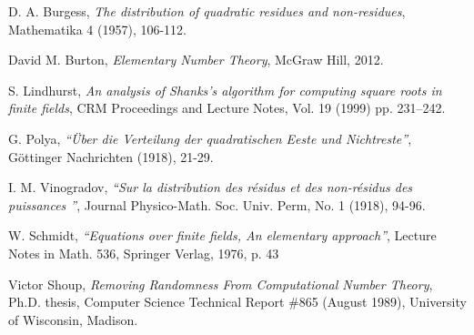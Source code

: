 \documentclass{report}
\begin{document}
%
%
%
%
%
%
%
\begin{thebibliography}{9}

 D. A. Burgess,
\textit{The distribution of quadratic residues and non-residues},
Mathematika 4 (1957), 106-112.

David M. Burton, \textit{Elementary Number Theory},
McGraw Hill, 2012.

S. Lindhurst, \textit{An analysis of Shanks's algorithm for computing square roots in finite fields},
CRM Proceedings and Lecture Notes, Vol. 19 (1999) pp. 231–242.

G. Polya,
\textit{``{\"U}ber die Verteilung der quadratischen Eeste und Nichtreste''},
G{\"o}ttinger Nachrichten (1918), 21-29.

I. M. Vinogradov,
\textit{``Sur la distribution des r{\'e}sidus et des non-r{\'e}sidus des puissances ''},
Journal Physico-Math. Soc. Univ. Perm, No. 1 (1918), 94-96.

W. Schmidt,
\textit{``Equations over finite fields, An elementary approach''},
Lecture Notes in Math. 536, Springer Verlag, 1976, p. 43

Victor Shoup,
\textit{Removing Randomness From Computational Number Theory}, Ph.D. thesis,
Computer Science Technical Report \#865 (August 1989), University of Wisconsin, Madison.

%
\end{thebibliography}
%
\end{document}
